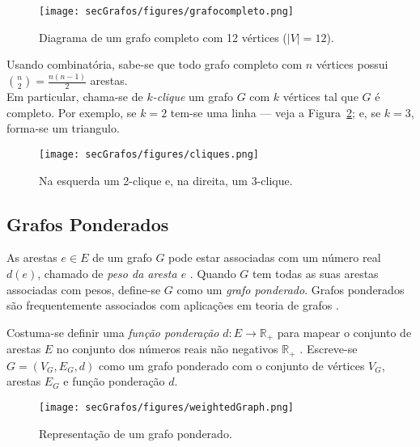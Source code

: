 \begin{figure}[H]
	\begin{center}
		\texttt{[image: secGrafos/figures/grafocompleto.png]}
	\end{center}
	\caption{Diagrama de um grafo completo com 12 vértices ($|V| = 12$).}
	\label{fig:grafocompleto}
\end{figure}

Usando combinatória, sabe-se que todo grafo completo com $n$ vértices possui ${n \choose 2}=\frac{n(n-1)}{2}$ arestas.
\\

Em particular, chama-se de \textit{$k$-clique} um grafo $G$ com $k$ vértices tal que $G$ é completo. Por exemplo, se $k=2$ tem-se uma linha --- veja a Figura~\ref{fig:cliques}; e, se $k=3$, forma-se um triangulo.

\begin{figure}[H]
	\begin{center}
		\texttt{[image: secGrafos/figures/cliques.png]}
	\end{center}
	\caption{Na esquerda um 2-clique e, na direita, um 3-clique.}
	\label{fig:cliques}
\end{figure}

\subsection{Grafos Ponderados}

As arestas $e\in E$ de um grafo $G$ pode estar associadas com um número real $d(e)$, chamado de \textit{peso da aresta $e$} \cite{graphTheoryApplicationsBondy}. Quando $G$ tem todas as suas arestas associadas com pesos, define-se $G$ como um \textit{grafo ponderado}. Grafos ponderados são frequentemente associados com aplicações em teoria de grafos \cite{grafosPremioElon}.

Costuma-se definir uma \textit{função ponderação} $d: E \longrightarrow \mathbb{R}_+$ para mapear o conjunto de arestas $E$ no conjunto dos números reais não negativos $\mathbb{R}_+$ \cite{libertiEDG}. Escreve-se $G = (V_G,E_G,d)$ como um grafo ponderado com o conjunto de vértices $V_G$, arestas $E_G$ e função ponderação $d$.

\begin{figure}[H]
	\begin{center}
		\texttt{[image: secGrafos/figures/weightedGraph.png]}
	\end{center}
	\caption{Representação de um grafo ponderado.}
	\label{fig:weightedGraph}
\end{figure}
